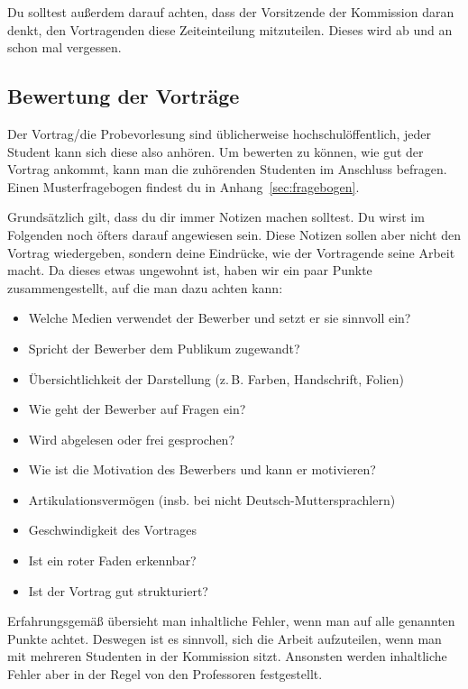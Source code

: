 Du solltest außerdem darauf achten, dass der Vorsitzende der Kommission daran denkt, den Vortragenden diese Zeiteinteilung mitzuteilen. Dieses wird ab und an schon mal vergessen.

\subsection{Bewertung der Vorträge}
Der Vortrag/die Probevorlesung sind üblicherweise hochschulöffentlich, jeder Student kann sich
diese also anhören. Um bewerten zu können, wie gut der Vortrag ankommt, kann man die zuhörenden Studenten
im Anschluss befragen. Einen Musterfragebogen findest du in Anhang~\ref{sec:fragebogen}.

Grundsätzlich gilt, dass du dir immer Notizen machen solltest. Du wirst im Folgenden noch öfters darauf angewiesen sein. Diese Notizen sollen aber nicht den Vortrag wiedergeben, sondern deine Eindrücke, wie der Vortragende seine Arbeit macht. Da dieses etwas ungewohnt ist, haben wir ein paar Punkte zusammengestellt, auf die man dazu achten kann:
\begin{itemize}
    \item Welche Medien verwendet der Bewerber und setzt er sie sinnvoll ein?
    \item Spricht der Bewerber dem Publikum zugewandt?
    \item Übersichtlichkeit der Darstellung (z.\,B. Farben, Handschrift, Folien)
    \item Wie geht der Bewerber auf Fragen ein?
    \item Wird abgelesen oder frei gesprochen?
    \item Wie ist die Motivation des Bewerbers und kann er motivieren?
    \item Artikulationsvermögen (insb. bei nicht Deutsch-Muttersprachlern)
    \item Geschwindigkeit des Vortrages
    \item Ist ein roter Faden erkennbar?
    \item Ist der Vortrag gut strukturiert?
\end{itemize}
Erfahrungsgemäß übersieht man inhaltliche Fehler, wenn man auf alle genannten Punkte achtet. Deswegen ist es sinnvoll, sich die Arbeit aufzuteilen, wenn man mit mehreren Studenten in der Kommission sitzt. Ansonsten werden inhaltliche Fehler aber in der Regel von den Professoren festgestellt.

